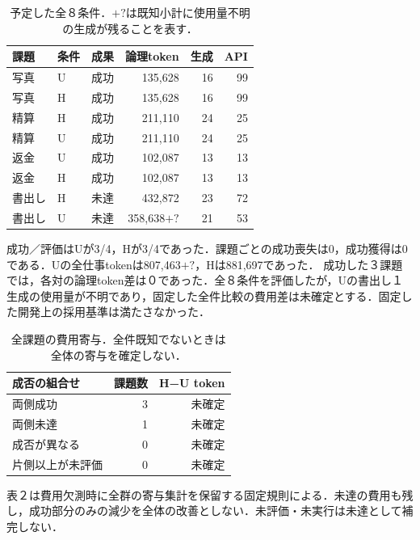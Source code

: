 \begin{table}[tb]
\centering\footnotesize\setlength{\tabcolsep}{3pt}
\caption{予定した全８条件．$+?$は既知小計に使用量不明の生成が残ることを表す．}
\begin{tabular}{lllrrr}
課題 & 条件 & 成果 & 論理token & 生成 & API \\ \hline
写真 & U & 成功 & 135,628 & 16 & 99 \\
写真 & H & 成功 & 135,628 & 16 & 99 \\
精算 & H & 成功 & 211,110 & 24 & 25 \\
精算 & U & 成功 & 211,110 & 24 & 25 \\
返金 & U & 成功 & 102,087 & 13 & 13 \\
返金 & H & 成功 & 102,087 & 13 & 13 \\
書出し & H & 未達 & 432,872 & 23 & 72 \\
書出し & U & 未達 & 358,638$+?$ & 21 & 53 \\
\hline\end{tabular}
\end{table}
成功／評価はUが3/4，Hが3/4であった．課題ごとの成功喪失は0，成功獲得は0である．Uの全仕事tokenは807,463$+?$，Hは881,697であった．
成功した３課題では，各対の論理token差は０であった．全８条件を評価したが，Uの書出し１生成の使用量が不明であり，固定した全件比較の費用差は未確定とする．固定した開発上の採用基準は満たさなかった．
\begin{table}[tb]
\centering\footnotesize\setlength{\tabcolsep}{3pt}
\caption{全課題の費用寄与．全件既知でないときは全体の寄与を確定しない．}
\begin{tabular}{lrr}
成否の組合せ & 課題数 & H−U token \\ \hline
両側成功 & 3 & 未確定 \\
両側未達 & 1 & 未確定 \\
成否が異なる & 0 & 未確定 \\
片側以上が未評価 & 0 & 未確定 \\
\hline\end{tabular}
\end{table}
表２は費用欠測時に全群の寄与集計を保留する固定規則による．未達の費用も残し，成功部分のみの減少を全体の改善としない．未評価・未実行は未達として補完しない．
